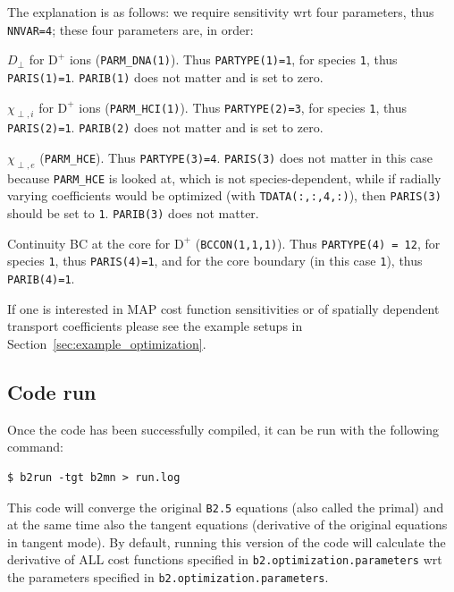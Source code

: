\begin{sloppypar}
The explanation is as follows: we require sensitivity wrt four parameters, thus {\tt NNVAR=4}; these four parameters are, in order:
\begin{description}
	\item $D_{\perp}$ for $\mathrm{D}^{+}$ ions ({\tt PARM\_DNA(1)}). Thus {\tt PARTYPE(1)=1}, for species {\tt 1}, thus {\tt PARIS(1)=1}. {\tt PARIB(1)} does not matter and is set to zero.
	\item $\chi_{\perp,i}$ for $\mathrm{D}^{+}$ ions ({\tt PARM\_HCI(1)}). Thus {\tt PARTYPE(2)=3}, for species {\tt 1}, thus {\tt PARIS(2)=1}. {\tt PARIB(2)} does not matter and is set to zero.
	\item $\chi_{\perp,e}$ ({\tt PARM\_HCE}). Thus {\tt PARTYPE(3)=4}. {\tt PARIS(3)} does not matter in this case because {\tt PARM\_HCE} is looked at, which is not species-dependent, while if radially varying coefficients would be optimized (with {\tt TDATA(:,:,4,:)}), then {\tt PARIS(3)} should be set to {\tt 1}. {\tt PARIB(3)} does not matter.
	\item Continuity BC at the core for $\mathrm{D}^{+}$ ({\tt BCCON(1,1,1)}). Thus {\tt PARTYPE(4) = 12}, for species {\tt 1}, thus {\tt PARIS(4)=1}, and for the core boundary (in this case {\tt 1}), thus {\tt PARIB(4)=1}.
\end{description}
\end{sloppypar}

If one is interested in MAP cost function sensitivities or of spatially dependent transport coefficients please see the example setups in Section~\ref{sec:example_optimization}.

\subsection{Code run}

Once the code has been successfully compiled, it can be run with the following command:
\begin{verbatim}
$ b2run -tgt b2mn > run.log
\end{verbatim}

This code will converge the original {\tt B2.5} equations (also called the primal) and at the same time also the tangent equations (derivative of the original equations in tangent mode). By default, running this version of the code will calculate the derivative of ALL cost functions specified in {\tt b2.optimization.parameters} wrt the parameters specified in {\tt b2.optimization.parameters}.

